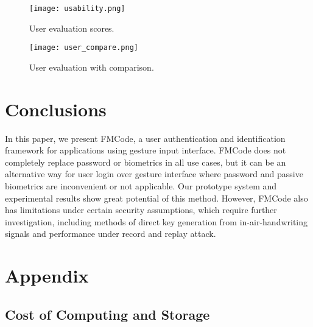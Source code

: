 \documentclass[conference]{IEEEtran}
\begin{document}
\begin{figure}[]
\begin{center}
\texttt{[image: usability.png]}
\end{center}
   \caption{User evaluation scores.}
\label{fig:usability}
\end{figure}

\begin{figure}[]
\begin{center}
\texttt{[image: user\_compare.png]}
\end{center}
   \caption{User evaluation with comparison.}
\label{fig:user_compare}
\end{figure}

\section{Conclusions}

In this paper, we present FMCode, a user authentication and identification framework for applications using gesture input interface. FMCode does not completely replace password or biometrics in all use cases, but it can be an alternative way for user login over gesture interface where password and passive biometrics are inconvenient or not applicable. Our prototype system and experimental results show great potential of this method. However, FMCode also has limitations under certain security assumptions, which require further investigation, including methods of direct key generation from in-air-handwriting signals and performance under record and replay attack.





\newpage




\section*{Appendix}



\subsection{Cost of Computing and Storage}
\end{document}

